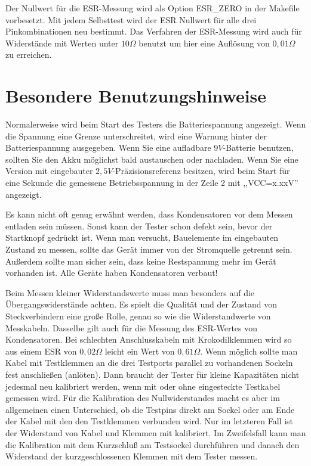 Der Nullwert für die ESR-Messung wird als Option ESR\_ZERO in der Makefile vorbesetzt.
Mit jedem Selbsttest wird der ESR Nullwert für alle drei Pinkombinationen neu bestimmt.
Das Verfahren der ESR-Messung wird auch für Widerstände mit Werten unter \(10\Omega\) benutzt um
hier eine Auflösung von \(0,01\Omega\) zu erreichen.

\section{Besondere Benutzungshinweise}
Normalerweise wird beim Start des Testers die Batteriespannung angezeigt. Wenn die Spannung eine Grenze unterschreitet, 
wird eine Warnung hinter der Batteriespannung ausgegeben. Wenn Sie eine aufladbare \(9V\)-Batterie benutzen, sollten Sie
den Akku möglichst bald austauschen oder nachladen.
Wenn Sie eine Version mit eingebauter \(2,5V\)-Präzisionsreferenz besitzen, wird beim Start für eine Sekunde die
gemessene Betriebsspannung in der Zeile 2 mit ,,VCC=x.xxV'' angezeigt.

Es kann nicht oft genug erwähnt werden, dass Kondensatoren vor dem Messen entladen sein müssen.
Sonst kann der Tester schon defekt sein, bevor der Startknopf gedrückt ist.
Wenn man versucht, Bauelemente im eingebauten Zustand zu messen, sollte das Gerät immer von
der Stromquelle getrennt sein. Außerdem sollte man sicher sein, dass keine Restspannung mehr
im Gerät vorhanden ist. Alle Geräte haben Kondensatoren verbaut!

Beim Messen kleiner Widerstandswerte muss man besonders auf die Übergangswiderstände achten.
Es spielt die Qualität und der Zustand von Steckverbindern eine große Rolle, genau so wie die
Widerstandwerte von Messkabeln. Dasselbe gilt auch für die Messung des ESR-Wertes von Kondensatoren.
Bei schlechten Anschlusskabeln mit Krokodilklemmen wird so aus einem ESR von \(0,02\Omega\) leicht
ein Wert von \(0,61\Omega\).
Wenn möglich sollte man Kabel mit Testklemmen an die drei Testports parallel zu vorhandenen Sockeln fest anschließen (anlöten).
Dann braucht der Tester für kleine Kapazitäten nicht jedesmal neu kalibriert werden, wenn mit oder ohne eingesteckte
Testkabel gemessen wird. Für die Kalibration des Nullwiderstandes macht es aber im allgemeinen einen Unterschied, 
ob die Testpins direkt am Sockel oder am Ende der Kabel mit den den Testklemmen verbunden wird. Nur im letzteren
Fall ist der Widerstand von Kabel und Klemmen mit kalibriert. Im Zweifelsfall kann man die Kalibration mit dem
Kurzschluß am Testsockel durchführen und danach den Widerstand der kurzgeschlossenen Klemmen mit dem Tester messen.

